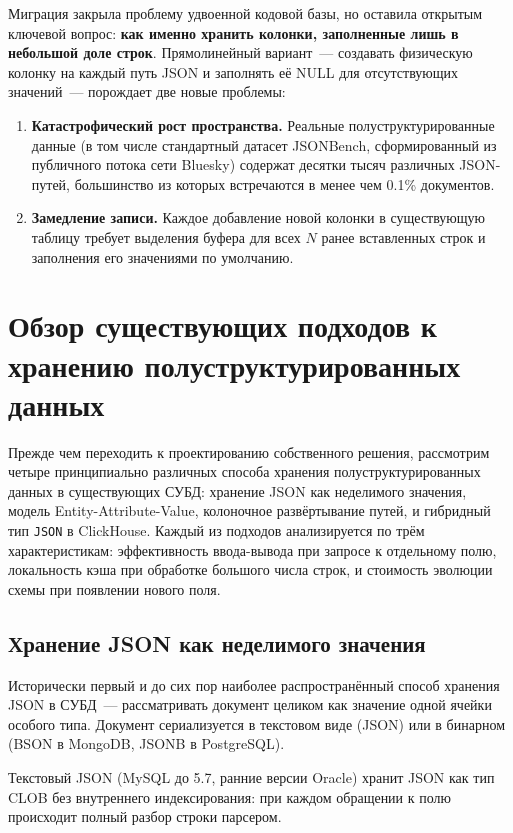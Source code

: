 Миграция закрыла проблему удвоенной кодовой базы, но оставила
открытым ключевой вопрос: \textbf{как именно хранить колонки,
заполненные лишь в небольшой доле строк}. Прямолинейный вариант~---
создавать физическую колонку на каждый путь JSON и заполнять её
NULL для отсутствующих значений~--- порождает две новые проблемы:
\begin{enumerate}
    \item \textbf{Катастрофический рост пространства.} Реальные
    полуструктурированные данные (в том числе стандартный датасет
    JSONBench, сформированный из публичного потока сети Bluesky)
    содержат десятки тысяч различных JSON-путей, большинство из
    которых встречаются в менее чем 0.1\% документов.
    \item \textbf{Замедление записи.} Каждое добавление новой
    колонки в существующую таблицу требует выделения буфера для
    всех $N$ ранее вставленных строк и заполнения его значениями
    по умолчанию.
\end{enumerate}

\section{Обзор существующих подходов к хранению полуструктурированных данных}

\startrelatedwork

Прежде чем переходить к проектированию собственного решения,
рассмотрим четыре принципиально различных способа хранения
полуструктурированных данных в существующих СУБД: хранение JSON как
неделимого значения, модель Entity-Attribute-Value, колоночное
развёртывание путей, и гибридный тип \texttt{JSON} в ClickHouse.
Каждый из подходов анализируется по трём характеристикам:
эффективность ввода-вывода при запросе к отдельному полю,
локальность кэша при обработке большого числа строк, и стоимость
эволюции схемы при появлении нового поля.

\subsection{Хранение JSON как неделимого значения}

Исторически первый и до сих пор наиболее распространённый способ
хранения JSON в СУБД~--- рассматривать документ целиком как
значение одной ячейки особого типа. Документ сериализуется в
текстовом виде (JSON) или в бинарном (BSON в MongoDB, JSONB в
PostgreSQL).

Текстовый JSON (MySQL до 5.7, ранние версии Oracle) хранит JSON как
тип CLOB без внутреннего индексирования: при каждом обращении к полю
происходит полный разбор строки парсером.

